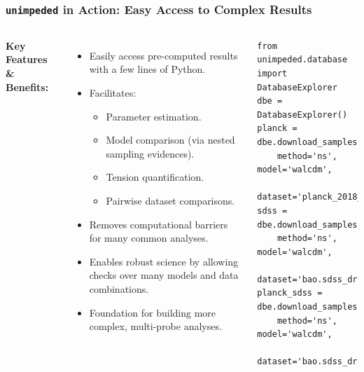 \documentclass[aspectratio=169]{beamer}
\begin{document}
\begin{frame}[fragile]
    \frametitle{\texttt{unimpeded} in Action: Easy Access to Complex Results}
    \begin{columns}[T]
        \textbf{Key Features \& Benefits:}
        \begin{itemize}
            \item Easily access pre-computed results with a few lines of Python.
            \item Facilitates:
                \begin{itemize}
                    \item Parameter estimation.
                    \item Model comparison (via nested sampling evidences).
                    \item Tension quantification.
                    \item Pairwise dataset comparisons.
                \end{itemize}
            \item Removes computational barriers for many common analyses.
            \item Enables robust science by allowing checks over many models and data combinations.
            \item Foundation for building more complex, multi-probe analyses.
        \end{itemize}

\lstset{language=Python}
\lstset{frame=lines}
\lstset{basicstyle=\footnotesize}
\begin{lstlisting}
from unimpeded.database import DatabaseExplorer
dbe = DatabaseExplorer()
planck = dbe.download_samples(
    method='ns', model='walcdm',
    dataset='planck_2018_CamSpec')
sdss = dbe.download_samples(
    method='ns', model='walcdm',
    dataset='bao.sdss_dr16')
planck_sdss = dbe.download_samples(
    method='ns', model='walcdm',
    dataset='bao.sdss_dr16+planck_2018_CamSpec')
\end{lstlisting}
    \end{columns}
\end{frame}
\end{document}
